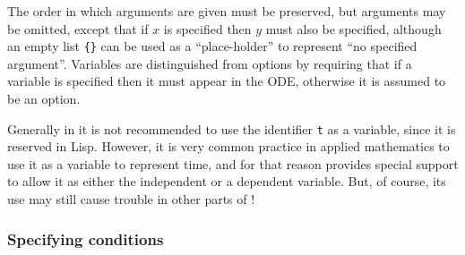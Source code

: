 The order in which arguments are given must be preserved, but
arguments may be omitted, except that if $x$ is specified then $y$
must also be specified, although an empty list \texttt{\{\}} can be used
as a ``place-holder'' to represent ``no specified argument''.
Variables are distinguished from options by requiring that if a
variable is specified then it must appear in the ODE, otherwise it is
assumed to be an option.

Generally in \REDUCE{} it is not recommended to use the identifier
\texttt{t} as a variable, since it is reserved in Lisp.  However, it is
very common practice in applied mathematics to use it as a variable to
represent time, and for that reason  provides special support
to allow it as either the independent or a dependent variable.  But,
of course, its use may still cause trouble in other parts of \REDUCE!


\subsubsection{Specifying conditions}

